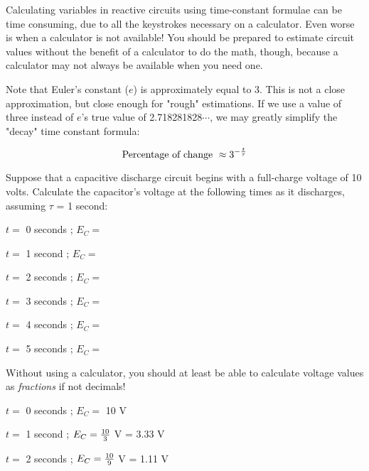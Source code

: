 

Calculating variables in reactive circuits using time-constant formulae can be time consuming, due to all the keystrokes necessary on a calculator.  Even worse is when a calculator is not available!  You should be prepared to estimate circuit values without the benefit of a calculator to do the math, though, because a calculator may not always be available when you need one.

Note that Euler's constant ($e$) is approximately equal to 3.  This is not a close approximation, but close enough for "rough" estimations.  If we use a value of three instead of $e$'s true value of 2.718281828$\cdots$, we may greatly simplify the "decay" time constant formula:

$$\hbox{Percentage of change } \approx 3^{-{t \over \tau}}$$

Suppose that a capacitive discharge circuit begins with a full-charge voltage of 10 volts.  Calculate the capacitor's voltage at the following times as it discharges, assuming $\tau$ = 1 second:

\medskip
\item{} $t =$ 0 seconds ; $E_C = $
\item{} $t =$ 1 second ; $E_C = $
\item{} $t =$ 2 seconds ; $E_C = $
\item{} $t =$ 3 seconds ; $E_C = $
\item{} $t =$ 4 seconds ; $E_C = $
\item{} $t =$ 5 seconds ; $E_C = $
\medskip

Without using a calculator, you should at least be able to calculate voltage values as {\it fractions} if not decimals!







\item{} $t =$ 0 seconds ; $E_C = $ 10 V

\vskip 5pt

\item{} $t =$ 1 second ; $E_C = {10 \over 3}$ V = 3.33 V

\vskip 5pt

\item{} $t =$ 2 seconds ; $E_C = {10 \over 9}$ V = 1.11 V 

